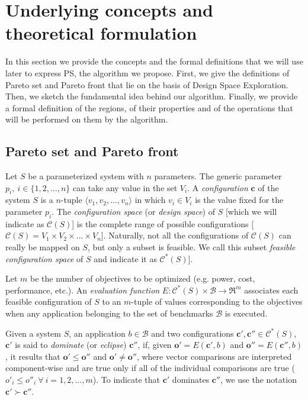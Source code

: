 
\section{Underlying concepts and theoretical formulation}

In this section we provide the concepts and the formal
definitions that we will use later to express PS, the algorithm we
propose.  First, we give the definitions of Pareto set and Pareto
front that lie on the basis of Design Space Exploration.
Then, we sketch the fundamental idea behind our algorithm. Finally, we
provide a formal definition of the regions, of their properties and of
the operations that will be performed on them by the algorithm.


\subsection{Pareto set and Pareto front}

Let $S$ be a parameterized system with $n$ parameters. The generic
parameter $p_i, \ i \in \{1,2,\ldots,n\}$ can take any value in
the set $V_i$. A {\em configuration} $\mathbf{c}$ of the system
$S$ is a $n$-tuple $\langle v_1,v_2,\ldots,v_n \rangle$ in which
$v_i \in V_i$ is the value fixed for the parameter $p_i$. The {\em
configuration space} (or {\em design space}) of $S$ [which we will
indicate as $\mathcal{C}(S)$] is the complete range of possible
configurations [$\mathcal{C}(S) = V_1 \times V_2 \times \ldots
\times V_n$]. Naturally, not all the configurations of
$\mathcal{C}(S)$ can really be mapped on $S$, but only a subset 
is feasible. We call this subset {\em
feasible configuration space} of $S$ and indicate it as
$\mathcal{C}^*(S)$].

Let $m$ be the number of objectives to be optimized (e.g. power,
cost, performance, etc.). An {\em evaluation function}
$E:\mathcal{C}^*(S)\times \mathcal{B} \longrightarrow \Re^m$ associates each feasible configuration of $S$ to
an $m$-tuple of values corresponding to the objectives when any application belonging to the set of benchmarks
$\mathcal{B}$ is executed.

Given a system $S$, an application $b \in \mathcal{B}$ and two
configurations $\mathbf{c}', \mathbf{c}'' \in \mathcal{C}^*(S)$,
$\mathbf{c}'$ is said to {\em dominate} (or {\em eclipse})
$\mathbf{c}''$, if, given $\mathbf{o}'=E(\mathbf{c}', b)$ and
$\mathbf{o}''=E(\mathbf{c}'', b)$, it results that $\mathbf{o}'
\leq \mathbf{o}''$ and $\mathbf{o}' \neq \mathbf{o}''$, where
vector comparisons are interpreted component-wise and are true
only if all of the individual comparisons are true ($o'_i \leq
o''_i \ \forall \ i = 1,2,\ldots,m$). To indicate that 
$\mathbf{c}'$ dominates $\mathbf{c}''$, we use the notation
$\mathbf{c}' \succ \mathbf{c}''$.

